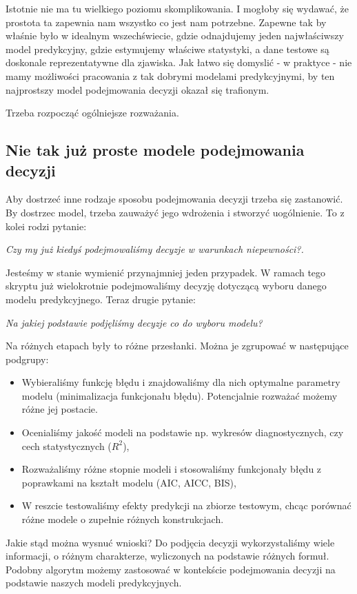 \documentclass[10pt,a4paper]{book}
\begin{document}
Istotnie nie ma tu wielkiego poziomu skomplikowania. I mogłoby się wydawać, że prostota ta zapewnia nam wszystko co jest nam potrzebne. Zapewne tak by właśnie było w idealnym wszechświecie, gdzie odnajdujemy jeden najwłaściwszy model predykcyjny, gdzie estymujemy właściwe statystyki, a dane testowe są doskonale reprezentatywne dla zjawiska. Jak łatwo się domyslić - w praktyce - nie mamy możliwości pracowania z tak dobrymi modelami predykcyjnymi, by ten najprostszy model podejmowania decyzji okazał się trafionym.

Trzeba rozpocząć ogólniejsze rozważania.

\subsection{Nie tak już proste modele podejmowania decyzji} 

Aby dostrzeć inne rodzaje sposobu podejmowania decyzji trzeba się zastanowić. By dostrzec model, trzeba zauważyć jego wdrożenia i stworzyć uogólnienie. To z kolei rodzi pytanie:

\textit{Czy my już kiedyś podejmowaliśmy decyzje w warunkach niepewności?.}

Jesteśmy w stanie wymienić przynajmniej jeden przypadek. W ramach tego skryptu już wielokrotnie podejmowaliśmy decyzję dotyczącą wyboru danego modelu predykcyjnego. Teraz drugie pytanie:

\textit{Na jakiej podstawie podjęliśmy decyzje co do wyboru modelu?}

Na różnych etapach były to różne przesłanki. Można je zgrupować w następujące podgrupy:

\begin{itemize}
\item Wybieraliśmy funkcję błędu i znajdowaliśmy dla nich optymalne parametry modelu (minimalizacja funkcjonału błędu). Potencjalnie rozważać możemy różne jej postacie.
\item Ocenialiśmy jakość modeli na podstawie np. wykresów diagnostycznych, czy cech statystycznych ($R^2$),
\item Rozważaliśmy różne stopnie modeli i stosowaliśmy funkcjonały błędu z poprawkami na kształt modelu (AIC, AICC, BIS),
\item W reszcie testowaliśmy efekty predykcji na zbiorze testowym, chcąc porównać różne modele o zupełnie różnych konstrukcjach.
\end{itemize}

Jakie stąd można wysnuć wnioski? Do podjęcia decyzji wykorzystaliśmy wiele informacji, o różnym charakterze, wyliczonych na podstawie różnych formuł. Podobny algorytm możemy zastosować w kontekście podejmowania decyzji na podstawie naszych modeli predykcyjnych. 
\end{document}
